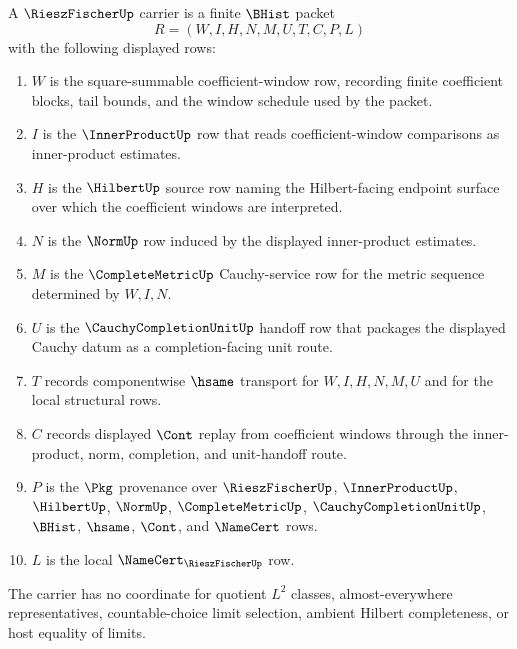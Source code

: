 \begin{definition}
\label{def:riesz-fischer-carrier}
A $\RieszFischerUp$ carrier is a finite $\BHist$ packet
$$
R=(W,I,H,N,M,U,T,C,P,L)
$$
with the following displayed rows:
\begin{enumerate}
\item $W$ is the square-summable coefficient-window row, recording finite coefficient blocks, tail bounds, and the window schedule used by the packet.
\item $I$ is the $\InnerProductUp$ row that reads coefficient-window comparisons as inner-product estimates.
\item $H$ is the $\HilbertUp$ source row naming the Hilbert-facing endpoint surface over which the coefficient windows are interpreted.
\item $N$ is the $\NormUp$ row induced by the displayed inner-product estimates.
\item $M$ is the $\CompleteMetricUp$ Cauchy-service row for the metric sequence determined by $W,I,N$.
\item $U$ is the $\CauchyCompletionUnitUp$ handoff row that packages the displayed Cauchy datum as a completion-facing unit route.
\item $T$ records componentwise $\hsame$ transport for $W,I,H,N,M,U$ and for the local structural rows.
\item $C$ records displayed $\Cont$ replay from coefficient windows through the inner-product, norm, completion, and unit-handoff route.
\item $P$ is the $\Pkg$ provenance over $\RieszFischerUp$, $\InnerProductUp$, $\HilbertUp$, $\NormUp$, $\CompleteMetricUp$, $\CauchyCompletionUnitUp$, $\BHist$, $\hsame$, $\Cont$, and $\NameCert$ rows.
\item $L$ is the local $\NameCert_{\RieszFischerUp}$ row.
\end{enumerate}
The carrier has no coordinate for quotient $L^{2}$ classes, almost-everywhere representatives, countable-choice limit selection, ambient Hilbert completeness, or host equality of limits.
\end{definition}

